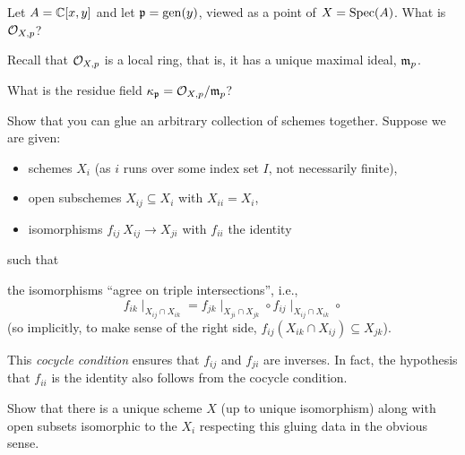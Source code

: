 \documentclass[12pt]{memoir}
\begin{document}
    \begin{Ej}
        Let $A = \mathbb{C}[x,y]$ and let $\mathfrak{p}=\operatorname{gen}(y)$, viewed as a point of $X = \operatorname{Spec}(A)$. What is $\mathcal{O}_{X,p}$?\par
        Recall that $\mathcal{O}_{X,p}$ is a local ring, that is, it has a unique maximal ideal, $\mathfrak{m}_p$.\par 
        What is the residue field $\kappa_{\mathfrak{p}}=\mathcal{O}_{X,p}/\mathfrak{m}_p$?
    \end{Ej}
    
    \begin{ptcbr}
    
    \end{ptcbr}

    \begin{Ej}[4.4.A Vakil]
        Show that you can glue an arbitrary collection of schemes together. Suppose we are given:
        \begin{itemize}
            \itemsep=-0.4em
            \item  schemes $X_i$ (as $i$ runs over some index set $I$, not necessarily finite),
            \item open subschemes $X_{ij}\subseteq X_i$ with $X_{ii}=X_i$,
            \item isomorphisms $f_{ij}\:X_{ij}\to X_{ji}$ with $f_{ii}$ the identity
        \end{itemize}
        such that 
        \begin{significant}
            the isomorphisms “agree on triple intersections”,
            i.e.,
            $$f_{ik}\mid_{X_{ij}\cap X_{ik}}= f_{jk}\mid_{X_{ji}\cap X_{jk}}\circ f_{ij}\mid_{X_{ij}\cap X_{ik}}\circ$$
            (so implicitly, to make sense of
            the right side, $f_{ij}(X_{ik}\cap X_{ij})\subseteq X_{jk}$).            
        \end{significant}
        This \emph{cocycle condition} ensures that $f_{ij}$ and $f_{ji}$ are inverses. In fact, the hypothesis that $f_{ii}$ is the identity also follows from the cocycle condition.\par 
        Show that there is a unique scheme $X$ (up to unique isomorphism) along with open subsets isomorphic to the $X_i$ respecting this gluing data in the obvious sense.
    \end{Ej}
    
    \begin{ptcbr}
    
    \end{ptcbr}
        
\end{document}
